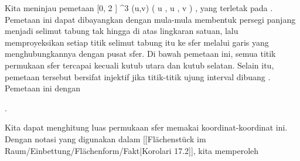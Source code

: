 {

Kita meninjau pemetaan
\maabbeledisp {\varphi} { [0, 2 \pi] \times \R} {\R^3
} {(u,v)} { {  }  ( \cos  u  , \sin  u  , v )
} {,}
yang
terletak pada  {.} Pemetaan ini dapat dibayangkan dengan mula-mula membentuk persegi panjang
 {} {}
\mathl{[0, 2 \pi] \times \R}{} menjadi selimut tabung tak hingga di atas lingkaran satuan, lalu memproyeksikan setiap titik selimut tabung itu ke sfer melalui garis yang menghubungkannya dengan pusat sfer. Di bawah pemetaan ini, semua titik permukaan sfer tercapai kecuali kutub utara dan kutub selatan. Selain itu, pemetaan tersebut bersifat injektif jika titik-titik ujung interval dibuang
 {} {.}
Pemetaan ini
dengan

 { . }

Kita dapat menghitung luas permukaan sfer memakai koordinat-koordinat ini. Dengan notasi yang digunakan dalam
[[Flächenstück im Raum/Einbettung/Flächenform/Fakt|Korolari 17.2]],
kita memperoleh

}
